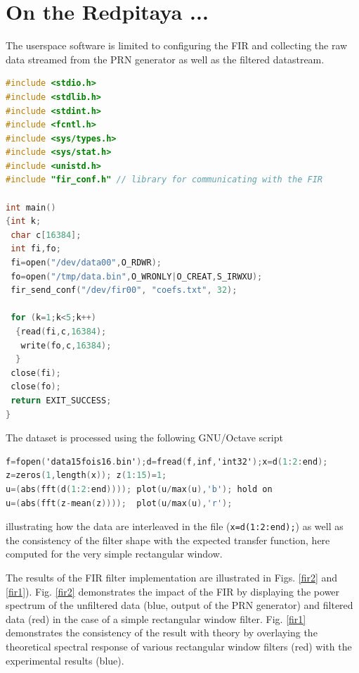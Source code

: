 \documentclass[12pt,oneside]{article}
\begin{document}
\section{On the Redpitaya ...}

The userspace software is limited to configuring the FIR and collecting the raw data streamed
from the PRN generator as well as the filtered datastream.

\begin{lstlisting}[language=C]
#include <stdio.h>
#include <stdlib.h>
#include <stdint.h>
#include <fcntl.h>
#include <sys/types.h>
#include <sys/stat.h>
#include <unistd.h>
#include "fir_conf.h" // library for communicating with the FIR

int main()
{int k;
 char c[16384];
 int fi,fo;
 fi=open("/dev/data00",O_RDWR);
 fo=open("/tmp/data.bin",O_WRONLY|O_CREAT,S_IRWXU);
 fir_send_conf("/dev/fir00", "coefs.txt", 32);

 for (k=1;k<5;k++)
  {read(fi,c,16384);
   write(fo,c,16384);
  }
 close(fi);
 close(fo);
 return EXIT_SUCCESS;
}
\end{lstlisting}

The dataset is processed using the following GNU/Octave script

\begin{lstlisting}[language=C]
f=fopen('data15fois16.bin');d=fread(f,inf,'int32');x=d(1:2:end); 
z=zeros(1,length(x)); z(1:15)=1; 
u=(abs(fft(d(1:2:end)))); plot(u/max(u),'b'); hold on
u=(abs(fft(z-mean(z))));  plot(u/max(u),'r');
\end{lstlisting}

illustrating how the data are interleaved in the file ({\tt x=d(1:2:end);})
as well as the consistency of the filter shape with the expected transfer
function, here computed for the very simple rectangular window.

The results of the FIR filter implementation are illustrated in Figs. 
\ref{fir2} and \ref{fir1}). Fig. \ref{fir2} demonstrates the impact of the
FIR by displaying the power spectrum of the unfiltered data (blue, output
of the PRN generator) and filtered data (red) in the case of a simple
rectangular window filter. Fig. \ref{fir1} demonstrates the consistency
of the result with theory by overlaying the theoretical spectral response
of various rectangular window filters (red) with the experimental results
(blue).
\end{document}
